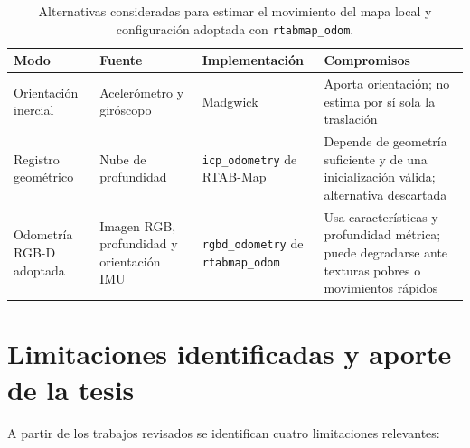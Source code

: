 \begin{table}[htbp]
\centering
\caption{Alternativas consideradas para estimar el movimiento del mapa local y configuración adoptada con \texttt{rtabmap\_odom}.}
\label{tab:comparacion-odom}
\begin{tabularx}{\linewidth}{lXXX}
\toprule
\textbf{Modo} & \textbf{Fuente} & \textbf{Implementación} & \textbf{Compromisos} \\
\midrule
Orientación inercial  & Acelerómetro y giróscopo & Madgwick \cite{Madgwick2010} & Aporta orientación; no estima por sí sola la traslación \\[4pt]
Registro geométrico   & Nube de profundidad      & \texttt{icp\_odometry} de RTAB-Map \cite{Labbe2019RTAB} & Depende de geometría suficiente y de una inicialización válida; alternativa descartada \\[4pt]
Odometría RGB-D adoptada & Imagen RGB, profundidad y orientación IMU & \texttt{rgbd\_odometry} de \texttt{rtabmap\_odom} \cite{Labbe2019RTAB} & Usa características y profundidad métrica; puede degradarse ante texturas pobres o movimientos rápidos \\[4pt]
\bottomrule
\end{tabularx}
\end{table}

\section{Limitaciones identificadas y aporte de la tesis}
\label{sec:ea-posicionamiento}

A partir de los trabajos revisados se identifican cuatro limitaciones relevantes:

